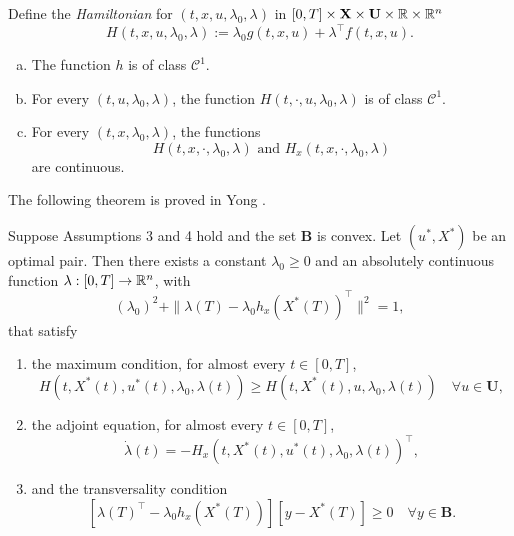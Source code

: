 Define the {\it Hamiltonian} for $(t,x,u,\lambda_0,\lambda)$ in $[0,T]\times \mathbf{X}\times \mathbf{U}\times\mathbb{R}\times\mathbb{R}^n$
    \[H(t,x,u,\lambda_0,\lambda):= \lambda_0g(t,x,u) + \lambda^\top f(t,x,u).  \]  
    

\begin{assumption}\rm  %
\begin{enumerate}[(a)]
    \item The function $h$ is of class $\mathcal{C}^1$.
    \item For every $(t,u,\lambda_0,\lambda)$, the function $H(t,\cdot,u,\lambda_0,\lambda)$ is of class $\mathcal{C}^1$.
    \item For every $(t,x,\lambda_0,\lambda)$, the functions
     \[ H(t,x,\cdot,\lambda_0,\lambda) \mbox{ and }   H_x(t,x,\cdot,\lambda_0,\lambda)  \]
are continuous.
\end{enumerate}
\end{assumption}


The following theorem is proved in Yong \cite[Theorem 2.3.1]{Yong2015}.

\begin{theorem} Suppose Assumptions 3 and 4 hold and the set $\mathbf{B}$ is convex. Let $(u^\ast,X^\ast)$ be an optimal pair. Then there exists a constant $\lambda_0\geq 0$ and an absolutely continuous function $\lambda:[0,T]\to\mathbb{R}^n$, with
    \begin{equation}\label{RegConL}
        (\lambda_0)^2 + \|\lambda(T)-\lambda_0h_x(X^\ast(T))^\top\|^2 = 1,
    \end{equation}
that satisfy
\begin{enumerate}[\rm (a)]
    \item the maximum condition, for almost every $t\in[0,T]$, 
        \begin{equation}\label{MaxCond}
             H(t,X^\ast(t),u^\ast(t),\lambda_0,\lambda(t)) \geq  H(t,X^\ast(t),u,\lambda_0,\lambda(t)) \quad \forall u\in \mathbf{U},
        \end{equation}
\item the adjoint equation, for almost every $t\in[0,T]$, 
      \begin{equation}\label{AdjEq}
          \dot{\lambda}(t) = -H_x(t,X^\ast(t),u^\ast(t),\lambda_0,\lambda(t))^\top,  
      \end{equation}
\item and the transversality condition
   \begin{equation}\label{TransCond}
    [\lambda(T)^\top-\lambda_0h_x(X^\ast(T))] [y-X^\ast(T)]\geq 0 \quad \forall y\in \mathbf{B}.
   \end{equation}
\end{enumerate}
\end{theorem}


